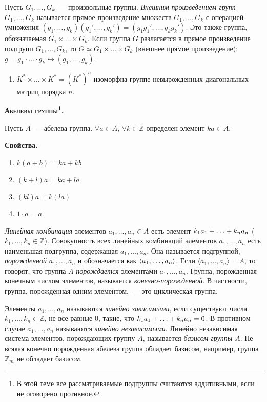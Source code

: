 \documentclass[a4paper]{article}
\newcommand*{\tema}[1]{\vspace{20pt}
\begin{center}{\textbf{\textsc{#1.}}}\vspace{5pt}
\end{center}}
\newcommand{\svoy}{\vspace{5pt}\noindent\textbf{Свойства.}\vspace{-6pt}}
\newcommand*{\p}[1]{#1\nobreak\discretionary{}{\hbox{$\mathsurround=0pt #1$}}{}}
\begin{document}
Пусть $G_1,\ldots,G_k$~--- произвольные группы. \emph{Внешним
произведением групп $G_1,\ldots,G_k$} называется прямое произведение
множеств $G_1,\ldots,G_k$ с операцией умножения
$(g_1,\ldots,g_k)(g_1',\ldots,g_k')=(g_1g_1',\ldots,g_kg_k')$. Это
также группа, обозначаемая $G_1\times \ldots\times G_k$. Если группа
$G$ разлагается в прямое произведение подгрупп $G_1,\ldots,G_k$, то
$G\simeq G_1\times\ldots \times G_k$ (внешнее прямое произведение):
$g=g_1\cdot\ldots\cdot g_k\leftrightarrow (g_1,\ldots,g_k)$.

\prim
\begin{enumerate}
  \item $K^*\times\ldots\times K^*=(K^*)^n$ изоморфна группе невырожденных
диагональных матриц порядка $n$.
\end{enumerate}

\tema{Абелевы группы\footnote{В этой теме все рассматриваемые
подгруппы считаются аддитивными, если не оговорено противное.}}

Пусть $A$~--- абелева группа. $\forall a\in A$, $\forall k\in
\mathbb{Z}$ определен элемент $ka\in A$.

\svoy
\begin{enumerate}
  \item $k(a+b)=ka+kb$
  \item $(k+l)a=ka+la$
  \item $(kl)a=k(la)$
  \item $1\cdot a=a$.
\end{enumerate}

\emph{Линейная комбинация} элементов $a_1,\ldots,a_n\in A$ есть
элемент $k_1a_1\p+\p\ldots+k_na_n$ ($k_1,\ldots,k_n\in \mathbb{Z}$).
Совокупность всех линейных комбинаций элементов $a_1,\ldots,a_n$
есть наименьшая подгруппа, содержащая $a_1,\ldots,a_n$. Она
называется подгруппой, \emph{порожденной} $a_1,\ldots,a_n$ и
обозначается как $\langle a_1,\p\ldots,a_n\rangle$. Если $\langle
a_1,\ldots,a_n\rangle=A$, то говорят, что группа $A$
\emph{порождается} элементами $a_1,\ldots,a_n$. Группа, порожденная
конечным числом элементов, называется \emph{конечно-порожденной}. В
частности, группа, порожденная одним элементом,~--- это циклическая
группа.

Элементы $a_1,\ldots,a_n$ называются \emph{линейно зависимыми}, если
существуют числа $k_1,\ldots,k_n\in \mathbb{Z}$, не все равные 0,
такие, что $k_1a_1+\ldots+k_na_n\p=0$. В противном случае
$a_1,\ldots,a_n$ называются \emph{линейно независимыми}. Линейно
независимая система элементов, порождающих группу $A$, называется
\emph{базисом группы $A$}. Не всякая конечно порожденная абелева
группа обладает базисом, например, группа $\mathbb{Z}_m$ не обладает
базисом.
\end{document}
